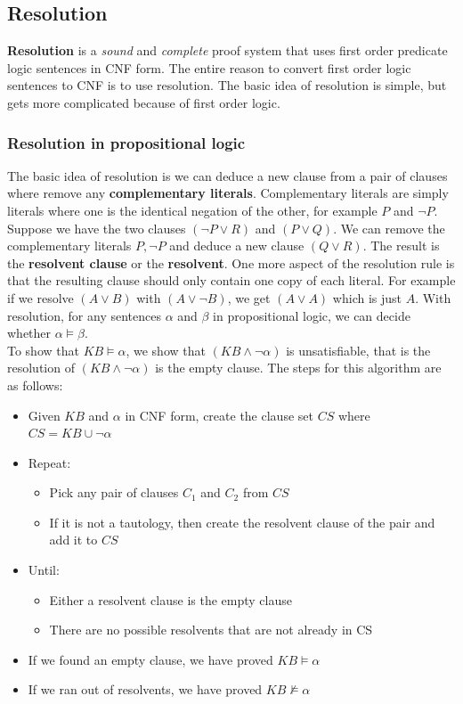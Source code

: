 \documentclass{article}
\newcommand{\n}[0]{\\[\baselineskip]}
\begin{document}
\subsection{Resolution}
\textbf{Resolution} is a \textit{sound} and \textit{complete} proof system that uses first order predicate logic sentences in CNF form. The entire reason to convert first order logic sentences to CNF is to use resolution. The basic idea of resolution is simple, but gets more complicated because of first order logic.

\subsubsection{Resolution in propositional logic}
The basic idea of resolution is we can deduce a new clause from a pair of clauses where remove any \textbf{complementary literals}. Complementary literals are simply literals where one is the identical negation of the other, for example $P$ and $\neg P$. 
\n
Suppose we have the two clauses $(\neg P \vee R)$ and $(P \vee Q)$. We can remove the complementary literals $P, \neg P$ and deduce a new clause $(Q \vee R)$. The result is the \textbf{resolvent clause} or the \textbf{resolvent}. One more aspect of the resolution rule is that the resulting clause should only contain one copy of each literal. For example if we resolve $(A \vee B)$ with $(A \vee \neg B)$, we get $(A \vee A)$ which is just $A$. With resolution, for any sentences $\alpha$ and $\beta$ in propositional logic, we can decide whether $\alpha \vDash \beta$. 
\n
To show that $KB \vDash \alpha$, we show that $(KB \wedge \neg \alpha)$ is unsatisfiable, that is the resolution of $(KB \wedge \neg \alpha)$ is the empty clause. The steps for this algorithm are as follows:
\begin{itemize}
\item Given $KB$ and $\alpha$ in CNF form, create the clause set \textbf{$CS$} where $CS = KB \cup \neg \alpha$
\item Repeat:
	\begin{itemize}
	\item Pick any pair of clauses $C_{1}$ and $C_{2}$ from $CS$
	\item If it is not a tautology, then create the resolvent clause of the pair and add it to $CS$
	\end{itemize}
\item Until:
	\begin{itemize}
	\item Either a resolvent clause is the empty clause
	\item There are no possible resolvents that are not already in CS
	\end{itemize}
\item If we found an empty clause, we have proved $KB \vDash \alpha$
\item If we ran out of resolvents, we have proved $KB \nvDash \alpha$
\end{itemize}
\end{document}
